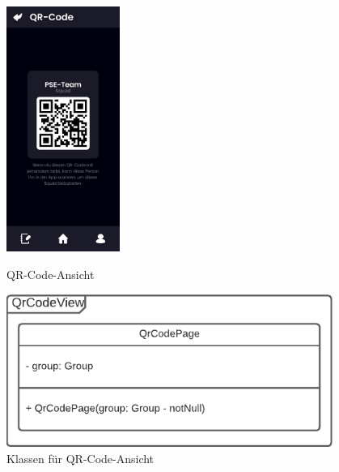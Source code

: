 \documentclass[parskip=full]{scrartcl}
\begin{document}
    \begin{figure}[htp]
        \begin{minipage}
            [t]{0.49\textwidth}
            \centering
            \includegraphics[height=80mm]{images/Presentation-layer/QRCodeView.jpg}
            \caption{QR-Code-Ansicht}
        \end{minipage}
        \begin{minipage}
            [t]{0.49\textwidth}
            \centering
            \includegraphics[width=0.95\textwidth]{images/Presentation-layer/QRCodeViewClass.pdf}
            \caption{Klassen für QR-Code-Ansicht}
        \end{minipage}
    \end{figure}    
    \newpage

\newpage
\end{document}
